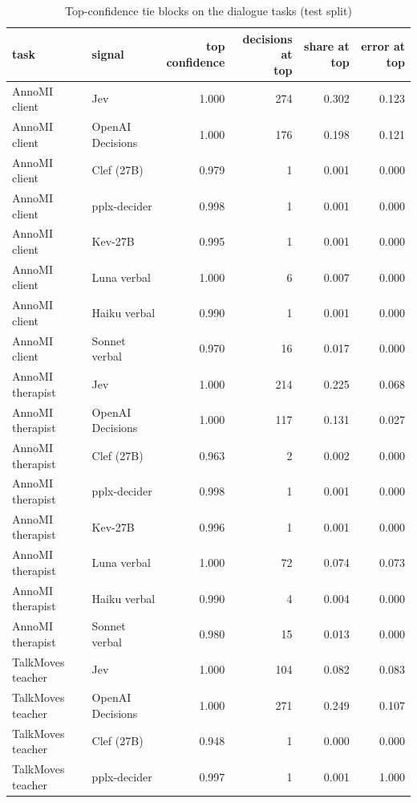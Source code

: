 \begin{table}[t]
\centering
\small
\caption{Top-confidence tie blocks on the dialogue tasks (test split)}
\label{tab:tab13_top_blocks}
\begin{adjustbox}{max width=\linewidth}
\begin{tabular}{llrrrr}
\toprule
task & signal & \makecell[br]{top \\{} confidence} & \makecell[br]{decisions at \\{} top} & share at top & error at top \\
\midrule
AnnoMI client & Jev & 1.000 & 274 & 0.302 & 0.123 \\
AnnoMI client & OpenAI Decisions & 1.000 & 176 & 0.198 & 0.121 \\
AnnoMI client & Clef (27B) & 0.979 & 1 & 0.001 & 0.000 \\
AnnoMI client & pplx-decider & 0.998 & 1 & 0.001 & 0.000 \\
AnnoMI client & Kev-27B & 0.995 & 1 & 0.001 & 0.000 \\
AnnoMI client & Luna verbal & 1.000 & 6 & 0.007 & 0.000 \\
AnnoMI client & Haiku verbal & 0.990 & 1 & 0.001 & 0.000 \\
AnnoMI client & Sonnet verbal & 0.970 & 16 & 0.017 & 0.000 \\
AnnoMI therapist & Jev & 1.000 & 214 & 0.225 & 0.068 \\
AnnoMI therapist & OpenAI Decisions & 1.000 & 117 & 0.131 & 0.027 \\
AnnoMI therapist & Clef (27B) & 0.963 & 2 & 0.002 & 0.000 \\
AnnoMI therapist & pplx-decider & 0.998 & 1 & 0.001 & 0.000 \\
AnnoMI therapist & Kev-27B & 0.996 & 1 & 0.001 & 0.000 \\
AnnoMI therapist & Luna verbal & 1.000 & 72 & 0.074 & 0.073 \\
AnnoMI therapist & Haiku verbal & 0.990 & 4 & 0.004 & 0.000 \\
AnnoMI therapist & Sonnet verbal & 0.980 & 15 & 0.013 & 0.000 \\
TalkMoves teacher & Jev & 1.000 & 104 & 0.082 & 0.083 \\
TalkMoves teacher & OpenAI Decisions & 1.000 & 271 & 0.249 & 0.107 \\
TalkMoves teacher & Clef (27B) & 0.948 & 1 & 0.000 & 0.000 \\
TalkMoves teacher & pplx-decider & 0.997 & 1 & 0.001 & 1.000 \\

\end{tabular}
\end{adjustbox}
\end{table}
